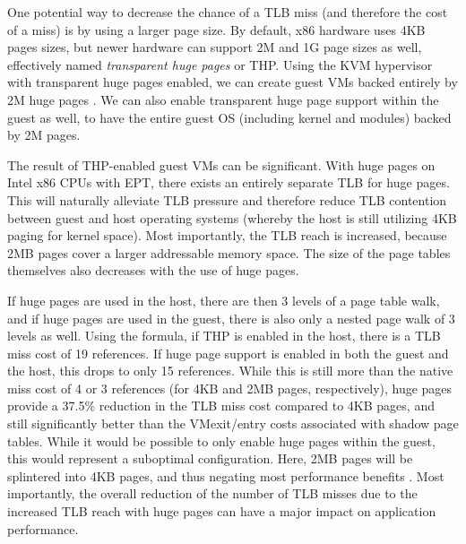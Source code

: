 One potential way to decrease the chance of a TLB miss (and therefore the cost of a miss) is by using a larger page size. By default, x86 hardware uses 4KB pages sizes, but newer hardware can support 2M and 1G page sizes as well, effectively named \emph{transparent huge pages} or THP.  Using the KVM hypervisor with transparent huge pages enabled, we can create guest VMs backed entirely by 2M huge pages \cite{Arcangeli:2010}. We can also enable transparent huge page support within the guest as well, to have the entire guest OS (including kernel and modules) backed by 2M pages. 

The result of THP-enabled guest VMs can be significant. With huge pages on Intel x86 CPUs with EPT, there exists an entirely separate TLB for huge pages. This will naturally alleviate TLB pressure and therefore reduce TLB contention between guest and host operating systems (whereby the host is still utilizing 4KB paging for kernel space). Most importantly, the TLB reach is increased, because 2MB pages cover a larger addressable memory space.  The size of the page tables themselves also decreases with the use of huge pages.  

If huge pages are used in the host, there are then 3 levels of a page table walk, and if huge pages are used in the guest, there is also only a nested page walk of 3 levels as well. Using the formula, if THP is enabled in the host, there is a TLB miss cost of 19 references.  If huge page support is enabled in both the guest and the host, this drops to only 15 references.  While this is still more than the native miss cost of 4 or 3 references (for 4KB and 2MB pages, respectively), huge pages provide a 37.5\% reduction in the TLB miss cost compared to 4KB pages, and still significantly better than the VMexit/entry costs associated with shadow page tables.  While it would be possible to only enable huge pages within the guest, this would represent a suboptimal configuration. Here, 2MB pages will be splintered into 4KB pages, and thus negating most performance benefits \cite{pham2015splintering}.  Most importantly, the overall reduction of the number of TLB misses due to the increased TLB reach with huge pages can have a major impact on application performance.  



